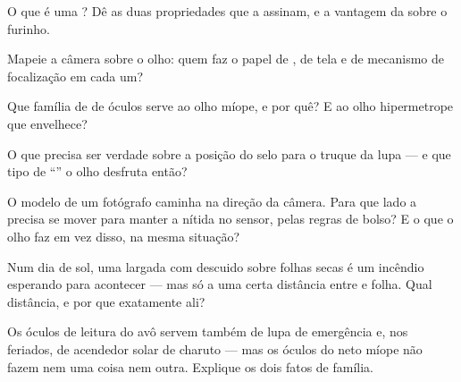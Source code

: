 \begin{exercise}[$\star$]\label{exo:g8:lenses-images:5}
O que é uma ? Dê as duas propriedades que a assinam, e a
vantagem da  sobre o furinho.
\end{exercise}

\begin{exercise}[$\star$]\label{exo:g8:lenses-images:6}
Mapeie a câmera sobre o olho: quem faz o papel de , de tela e de
mecanismo de focalização em cada um?
\end{exercise}

\begin{exercise}[$\star$]\label{exo:g8:lenses-images:7}
Que família de  de óculos serve ao olho míope, e por quê? E ao
olho hipermetrope que envelhece?
\end{exercise}

\begin{exercise}[$\star$]\label{exo:g8:lenses-images:8}
O que precisa ser verdade sobre a posição do selo para o truque da
lupa --- e que tipo de ``'' o olho desfruta então?
\end{exercise}

\begin{exercise}[$\star\star$]\label{exo:g8:lenses-images:9}
O modelo de um fotógrafo caminha na direção da câmera. Para que lado
a  precisa se mover para manter a  nítida no sensor, pelas
regras de bolso? E o que o olho faz em vez disso, na mesma situação?
\end{exercise}

\begin{exercise}[$\star\star$]\label{exo:g8:lenses-images:10}
Num dia de sol, uma  largada com descuido sobre folhas secas é
um incêndio esperando para acontecer --- mas só a uma certa distância
entre  e folha. Qual distância, e por que exatamente ali?
\end{exercise}

\begin{exercise}[$\star\star$]\label{exo:g8:lenses-images:11}
Os óculos de leitura do avô servem também de lupa de emergência e,
nos feriados, de acendedor solar de charuto --- mas os óculos do neto
míope não fazem nem uma coisa nem outra. Explique os dois fatos de
família.
\end{exercise}

